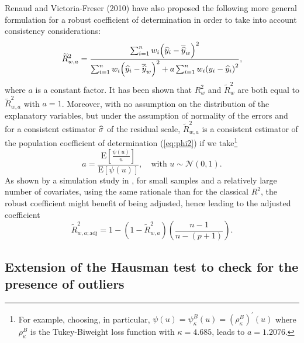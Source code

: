 Renaud and Victoria-Freser (2010) have also proposed the following more
general formulation for a robust coefficient of determination in order to take
into account consistency considerations:
\begin{equation}
\widetilde{R}_{w,a}^{2}=\frac{\sum_{i=1}^{n}w_{i}\left(  \sthat{y}%
_{i}-\overline{\sthat{y}}_{w}\right)  ^{2}}{\sum_{i=1}^{n}w_{i}\left(
\sthat{y}_{i}-\overline{\sthat{y}}_{w}\right)  ^{2}+a\sum_{i=1}^{n}%
w_{i}\left(  y_{i}-\sthat{y}_{i}\right)  ^{2}}, \label{eq:Rtilde2_w_a}%
\end{equation}
where $a$ is a constant factor. It has been shown that $R_{w}^{2}$ and
$\widetilde{R}_{w}^{2}$ are both equal to $\widetilde{R}_{w,a}^{2}$ with
$a=1$. Moreover, with no assumption on the distribution of the explanatory
variables, but under the assumption of normality of the errors and for a
consistent estimator $\widehat{\sigma}$ of the residual scale, $\widetilde
{R}_{w,a}^{2}$ is a consistent estimator of the population coefficient of
determination (\ref{eq:phi2}) if we take\footnote{For example, choosing, in
particular, $\psi\left(  u\right)  =\psi_{\kappa}^{B}\left(  u\right)
=\left(  \rho_{\kappa}^{B}\right)  ^{\prime}\left(  u\right)  $ where
$\rho_{\kappa}^{B}$ is the Tukey-Biweight loss function with $\kappa=4.685$,
leads to $a=1.2076$.}
\[
a=\frac{\mathrm{E}\left[  \frac{\psi\left(  u\right)  }{u}\right]
}{\mathrm{E}\left[  \psi\left(  u\right)  \right]  },\quad\text{with }%
u\sim\mathcal{N}\left(  0,1\right)  .
\]
As shown by a simulation study in \citet{Renaud:2010}, for
small samples and a relatively large number of covariates, using the same
rationale than for the classical $R^{2}$, the robust coefficient might benefit
of being adjusted, hence leading to the adjusted coefficient
\begin{equation}
\widetilde{R}_{w,a;\mathrm{adj}}^{2}=1-\left(  1-\widetilde{R}_{w,a}%
^{2}\right)  \left(  \frac{n-1}{n-\left(  p+1\right)  }\right)  .
\label{eq:Rtilde2_w_a_adj}%
\end{equation}


\subsection{Extension of the Hausman test to check for the presence of outliers}
\label{subsec:Hausman}

